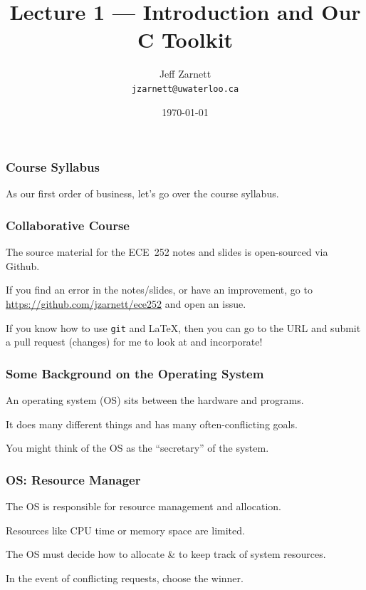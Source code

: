 

\title{Lecture 1 --- Introduction and Our C Toolkit }

\author{Jeff Zarnett \\ \small \texttt{jzarnett@uwaterloo.ca}}
\date{\today}




\begin{frame}
	\titlepage

\end{frame}

\begin{frame}
	\frametitle{Course Syllabus}

	As our first order of business, let's go over the course syllabus.

\end{frame}

\begin{frame}
	\frametitle{Collaborative Course}

	The source material for the ECE~252 notes and slides is open-sourced via Github.

	If you find an error in the notes/slides, or have an improvement, go to \url{https://github.com/jzarnett/ece252} and open an issue.

	If you know how to use \texttt{git} and \LaTeX, then you can go to the URL and submit a pull request (changes) for me to look at and incorporate!


\end{frame}

\begin{frame}
	\frametitle{Some Background on the Operating System}

	An operating system (OS) sits between the hardware and programs.

	It does many different things and has many often-conflicting goals.

	You might think of the OS as the ``secretary'' of the system.

\end{frame}

\begin{frame}
	\frametitle{OS: Resource Manager}

	The OS is responsible for resource management and allocation.

	Resources like CPU time or memory space are limited.

	The OS must decide how to allocate \& to keep track of system resources.

	In the event of conflicting requests, choose the winner.


\end{frame}

